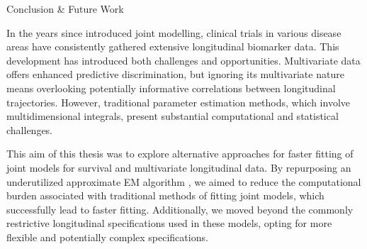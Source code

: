 \begin{chapter}{\label{cha:conclusion}Conclusion \& Future Work}

In the years since \citet{Wulfsohn97} introduced joint modelling, clinical trials in various disease areas have consistently gathered extensive longitudinal biomarker data. This development has introduced both challenges and opportunities. Multivariate data offers enhanced predictive discrimination, but ignoring its multivariate nature means overlooking potentially informative correlations between longitudinal trajectories. However, traditional parameter estimation methods, which involve multidimensional integrals, present substantial computational and statistical challenges.

This aim of this thesis was to explore alternative approaches for faster fitting of joint models for survival and multivariate longitudinal data. By repurposing an underutilized approximate EM algorithm \citep{Bernhardt15}, we aimed to reduce the computational burden associated with traditional methods of fitting joint models, which successfully lead to faster fitting. Additionally, we moved beyond the commonly restrictive longitudinal specifications used in these models, opting for more flexible and potentially complex specifications.




\end{chapter}
